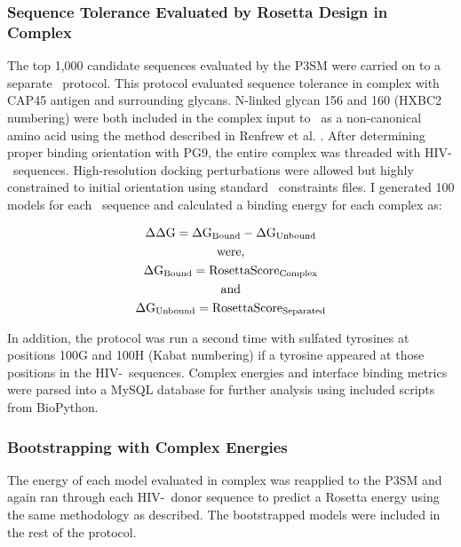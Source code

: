 \subsubsection{Sequence Tolerance Evaluated by Rosetta Design in Complex}
The top 1,000 candidate sequences evaluated by the P3SM were carried on to a separate \rosetta~protocol. This protocol evaluated sequence tolerance in complex with CAP45 antigen and surrounding glycans. N-linked glycan 156 and 160 (HXBC2 numbering) were both included in the complex input to \rosetta~as a non-canonical amino acid using the method described in Renfrew et al. \citep{Renfrew:2012ci}. After determining proper binding orientation with PG9, the entire complex was threaded with HIV-\naive~sequences. High-resolution docking perturbations were allowed but highly constrained to initial orientation using standard \rosetta~constraints files. I generated 100 models for each \naive~sequence and calculated a binding energy for each complex as:

\begin{gather*}
    \Delta \Delta \textup{G} = \Delta \textup{G}_{\textup{Bound}} - \Delta \textup{G}_{\textup{Unbound}} \\
    \textup{were,} \\
    \Delta \textup{G}_{\textup{Bound}} = \textup{RosettaScore}_{\textup{Complex}} \\
    \textup{and}\\
    \Delta \textup{G}_{\textup{Unbound}} = \textup{RosettaScore}_{\textup{Separated}}
\end{gather*}

In addition, the protocol was run a second time with sulfated tyrosines at positions 100G and 100H (Kabat numbering) if a tyrosine appeared at those positions in the HIV-\naive~sequences. Complex energies and interface binding metrics were parsed into a MySQL database for further analysis using included scripts from BioPython.

\subsubsection{Bootstrapping with Complex Energies}
The energy of each model evaluated in complex was reapplied to the P3SM and again ran through each HIV-\naive~donor sequence to predict a Rosetta energy using the same methodology as described. The bootstrapped models were included in the rest of the protocol.

